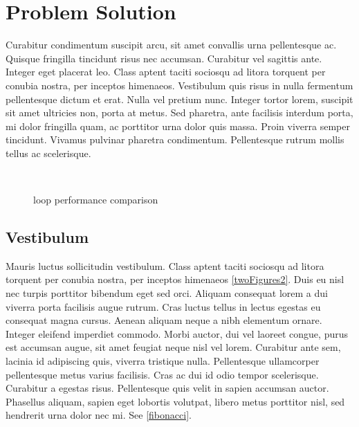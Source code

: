 \section{Problem Solution}
Curabitur condimentum suscipit arcu, sit amet convallis urna pellentesque ac. Quisque fringilla tincidunt risus nec accumsan. Curabitur vel sagittis ante. Integer eget placerat leo. Class aptent taciti sociosqu ad litora torquent per conubia nostra, per inceptos himenaeos. Vestibulum quis risus in nulla fermentum pellentesque dictum et erat. Nulla vel pretium nunc. Integer tortor lorem, suscipit sit amet ultricies non, porta at metus. Sed pharetra, ante facilisis interdum porta, mi dolor fringilla quam, ac porttitor urna dolor quis massa. Proin viverra semper tincidunt. Vivamus pulvinar pharetra condimentum. Pellentesque rutrum mollis tellus ac scelerisque.

\begin{figure}
    \centering
        ~
        \caption{loop performance comparison}
    \label{twoFigures}
\end{figure}

\subsection{Vestibulum}
Mauris luctus sollicitudin vestibulum. Class aptent taciti sociosqu ad litora torquent per conubia nostra, per inceptos himenaeos \cref{twoFigures2}. Duis eu nisl nec turpis porttitor bibendum eget sed orci. Aliquam consequat lorem a dui viverra porta facilisis augue rutrum. Cras luctus tellus in lectus egestas eu consequat magna cursus. Aenean aliquam neque a nibh elementum ornare. Integer eleifend imperdiet commodo. Morbi auctor, dui vel laoreet congue, purus est accumsan augue, sit amet feugiat neque nisl vel lorem. Curabitur ante sem, lacinia id adipiscing quis, viverra tristique nulla. Pellentesque ullamcorper pellentesque metus varius facilisis. Cras ac dui id odio tempor scelerisque. Curabitur a egestas risus. Pellentesque quis velit in sapien accumsan auctor. Phasellus aliquam, sapien eget lobortis volutpat, libero metus porttitor nisl, sed hendrerit urna dolor nec mi. See \cref{fibonacci}.

